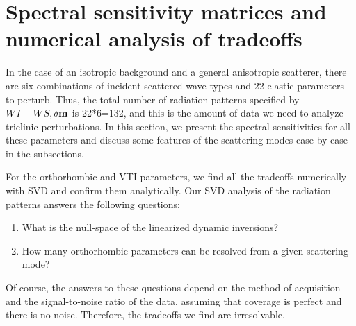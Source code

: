 \section{Spectral sensitivity matrices and numerical analysis of tradeoffs}
In the case of an isotropic background and a general anisotropic scatterer, there are six 
combinations of incident-scattered wave types and 22 elastic 
parameters to perturb. Thus, the total number of radiation patterns specified by 
${WI-WS, \delta \mathbf{m}}$ is 22*6=132, and this is the amount of data we need to analyze triclinic perturbations. In this section, we present the spectral sensitivities for all these 
parameters and discuss some features of the scattering modes case-by-case 
in the subsections. 

For the orthorhombic and VTI parameters, 
we find all the tradeoffs numerically with SVD and confirm them 
analytically.
Our SVD analysis of the radiation patterns answers the following 
questions:
\begin{enumerate}
	\item What is the null-space of the linearized dynamic inversions?
	
	\item How many orthorhombic parameters can be resolved from a 
	given scattering mode?
\end{enumerate}
Of course, the answers to these questions depend on the method of acquisition and the signal-to-noise ratio of the data, assuming that coverage is perfect and there is no 
noise. Therefore, the tradeoffs we find are irresolvable.
